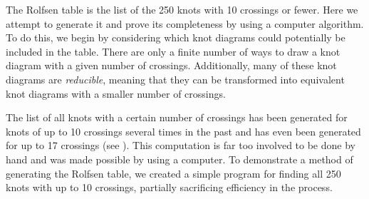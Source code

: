 \begin{paper}

The Rolfsen table is the list of the 250 knots with 10 crossings or fewer.
Here we attempt to generate it and prove its completeness by using a computer
algorithm.
To do this, we begin by considering which knot diagrams could potentially be
included in the table.
There are only a finite number of ways to draw a knot diagram with a given
number of crossings.
Additionally, many of these knot diagrams are \textit{reducible}, meaning that
they can be transformed into equivalent knot diagrams with a smaller number of
crossings.

The list of all knots with a certain number of crossings has been generated for
knots of up to 10 crossings several times in the past and has even been
generated for up to 17 crossings (see \cite{htw}).
This computation is far too involved to be done by hand and was made possible by
using a computer.
To demonstrate a method of generating the Rolfsen table, we created a simple
program for finding all 250 knots with up to 10 crossings, partially sacrificing
efficiency in the process.


\end{paper}
